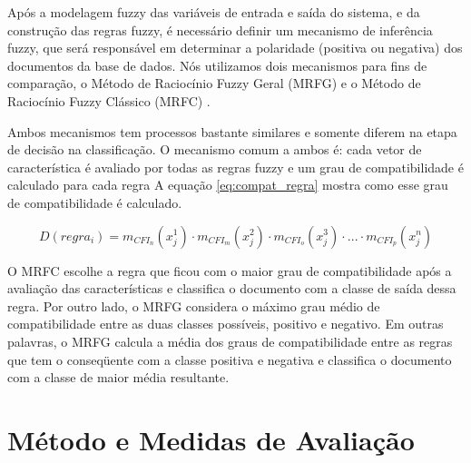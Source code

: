 \documentclass[template.tex]{subfiles}
\begin{document}
Após a modelagem fuzzy das variáveis de entrada e saída do sistema, e da construção das regras fuzzy, é necessário definir um mecanismo de inferência fuzzy, que será responsável em determinar a polaridade (positiva ou negativa) dos documentos da base de dados. Nós utilizamos dois mecanismos para fins de comparação, o Método de Raciocínio Fuzzy Geral (MRFG) e o Método de Raciocínio Fuzzy Clássico (MRFC) \cite{cordon1999proposal}.


Ambos mecanismos tem processos bastante similares e somente diferem na etapa de decisão na classificação. O mecanismo comum a ambos é: cada vetor de característica é avaliado por todas as regras fuzzy e um grau de compatibilidade é calculado para cada regra A equação \ref{eq:compat_regra} mostra como esse grau de compatibilidade é calculado. 


\begin{equation}
D(regra_i) = m_{CFI_n}(x_j^1) \cdot m_{CFI_m}(x_j^2) \cdot m_{CFI_o}(x_j^3) \cdot ...\cdot m_{CFI_p}(x_j^n)
\label{eq:compat_regra}
\end{equation}

O MRFC escolhe a regra que ficou com o maior grau de compatibilidade após a avaliação das características e classifica o documento com a classe de saída dessa regra.   Por outro lado, o MRFG considera o máximo grau médio de compatibilidade entre as duas classes possíveis, positivo e negativo. Em outras palavras, o MRFG calcula a média dos graus de compatibilidade entre as regras que tem o conseqüente com a classe positiva e negativa e classifica o documento com a classe de maior média resultante. 

\section{Método e Medidas de Avaliação}
\end{document}
